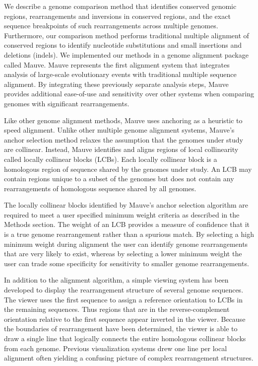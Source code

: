 \documentclass[titlepage,11pt]{article}
\begin{document}
We describe a genome comparison method that identifies conserved genomic
regions, rearrangements and inversions in conserved regions, and the exact
sequence breakpoints of such rearrangements across multiple genomes.
Furthermore, our comparison method performs traditional multiple alignment of
conserved regions to identify nucleotide substitutions and small insertions and
deletions (indels).  We implemented our methods in a genome alignment package
called Mauve.  Mauve represents the first alignment system that integrates
analysis of large-scale evolutionary events with traditional multiple sequence
alignment.  By integrating these previously separate analysis steps, Mauve
provides additional ease-of-use and sensitivity over other systems when
comparing genomes with significant rearrangements.

Like other genome alignment methods, Mauve uses anchoring as a heuristic to
speed alignment.  Unlike other multiple genome alignment systems, Mauve's
anchor selection method relaxes the assumption that the genomes under study are
collinear.  Instead, Mauve identifies and aligns regions of local collinearity
called locally collinear blocks (LCBs).  Each locally collinear block is a
homologous region of sequence shared by the genomes under study.  An LCB may
contain regions unique to a subset of the genomes but does not
contain any rearrangements of homologous sequence shared by all genomes.

The locally collinear blocks identified by Mauve's anchor selection algorithm
are required to meet a user specified minimum weight criteria as described in
the Methods section.  The weight of an LCB provides a measure of confidence
that it is a true genome rearrangement rather than a spurious match.
By selecting a high minimum weight during alignment the user can identify
genome rearrangements that are very likely to exist, whereas by selecting a
lower minimum weight the user can trade some specificity for sensitivity to
smaller genome rearrangements.

In addition to the alignment algorithm, a simple viewing system has been
developed to display the rearrangement structure of several genome sequences.
The viewer uses the first sequence to assign a reference orientation to LCBs in
the remaining sequences.  Thus regions that are in the reverse-complement
orientation relative to the first sequence appear inverted in the viewer.
Because the boundaries of rearrangement have been determined, the viewer is
able to draw a single line that logically connects the entire homologous
collinear blocks
from each genome.  Previous visualization systems drew one line per local
alignment often yielding a confusing picture of complex rearrangement
structures.
\end{document}
